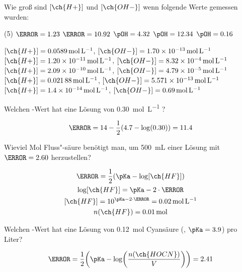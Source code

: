 \documentclass{scrartcl}
\begin{document}
\begin{question}
  Wie groß sind \([\ch{H+}]\) und \([\ch{OH-}]\) wenn folgende Werte gemessen
  wurden:
  \begin{tasks}(5)
    \task \(\pH = \num{1.23}\)
    \task \(\pH = \num{10.92}\)
    \task \(\pOH = \num{4.32}\)
    \task \(\pOH = \num{12.34}\)
    \task \(\pOH = \num{0.16}\)
  \end{tasks}
\end{question}
\begin{solution}
  \begin{tasks}
    \task $[\ch{H+}] = \SI{0.0589}{\mole\per\liter}$, $[\ch{OH-}] =
      \SI{1.70e-13}{\mole\per\liter}$
    \task $[\ch{H+}] = \SI{1.20e-11}{\mole\per\liter}$, $[\ch{OH-}] =
      \SI{8.32e-4}{\mole\per\liter}$
    \task $[\ch{H+}] = \SI{2.09e-10}{\mole\per\liter}$, $[\ch{OH-}] =
      \SI{4.79e-5}{\mole\per\liter}$
    \task $[\ch{H+}] = \SI{0.02188}{\mole\per\liter}$, $[\ch{OH-}] =
      \SI{5.571e-13}{\mole\per\liter}$
    \task $[\ch{H+}] = \SI{1.4e-14}{\mole\per\liter}$, $[\ch{OH-}] =
      \SI{0.69}{\mole\per\liter}$
  \end{tasks}
\end{solution}

\begin{question}
  Welchen \pH-Wert hat eine Lösung von \SI{.30}{\mole\per\liter} ?
\end{question}
\begin{solution}
  \[
    \pH = 14 - \frac{1}{2}(4.7 -\log(0.30)) = 11.4
  \]
\end{solution}

\begin{question}
  Wieviel Mol Fluss"-säure benötigt man, um \SI{500}{\milli\liter} einer Lösung
  mit \(\pH=\num{2.60}\) herzustellen?
\end{question}
\begin{solution}
  \begin{gather*}
    \pH = \frac{1}{2}(\pKa -\log[\ch{HF}]) \\
    \log[\ch{HF}] = \pKa - 2\cdot\pH \\
    [\ch{HF}] = 10^{\pKa-2\cdot\pH} = \SI{0.02}{\mole\per\liter} \\
    n(\ch{HF}) = \SI{0.01}{\mole}
  \end{gather*}
\end{solution}

\begin{question}
  Welchen \pH-Wert hat eine Lösung von \SI{.12}{\mole} Cyansäure (,
  \(\pKa=\num{3.9}\)) pro Liter?
\end{question}
\begin{solution}
  \[
    \pH = \frac{1}{2}\biggl(\pKa
          -\log\biggl(\frac{n(\ch{HOCN})}{V}\biggr)\biggr)
        = 2.41
  \]
\end{solution}
\end{document}
